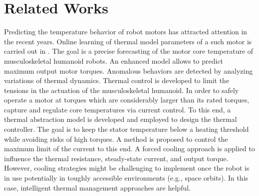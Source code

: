 \documentclass{ifacconf}
\begin{document}
\section{Related Works}

Predicting the temperature behavior of robot motors has attracted attention in the recent years.  Online learning of thermal model parameters of a such motor is carried out in \cite{kawaharazuka2020estimation}. The goal is a precise forecasting  of the motor core
temperature of musculoskeletal humanoid robots. An enhanced model allows to predict  maximum output motor torques. Anomalous behaviors are detected by analyzing variations of  thermal dynamics. Thermal control is developed to limit the tensions in the actuation of the musculoskeletal humanoid. In order to safely operate a motor at torques which are considerably larger than its rated torques, \cite{singh2021thermal} capture and regulate  core temperatures via current control. To this end, a thermal abstraction  model is developed and employed to design the thermal controller. The goal is to keep the stator temperature below a heating threshold while avoiding risks of high torques. A method is proposed to control the maximum limit of the current to this end. A forced cooling approach is applied to influence the thermal resistance, steady-state current, and output torque. However, cooling strategies might be challenging to implement once the robot is in use potentially in  toughly accessible environments (e.g., space orbits). In this case, intelligent thermal management approaches are helpful.
\end{document}

